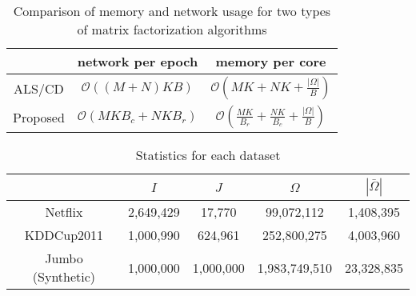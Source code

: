 \documentclass{article}
\newcommand{\1}[0]{\ensuremath{\boldsymbol{1}}\xspace}
\begin{document}
\begin{table}\label{mf_alg_comp}
\scriptsize
\caption{Comparison of memory and network usage for two types of matrix factorization algorithms}
\begin{tabular}{c|c|c}
~  &  network per epoch & memory per core\\
\hline
ALS/CD & $\mathcal{O}( (M+N) K B)$  & $\mathcal{O}(MK+NK + \frac{|\Omega|}{B})$  \\
Proposed & $\mathcal{O}( MK B_{c} + NK B_{r})$ & $\mathcal{O}(\frac{MK}{B_{r}}+\frac{NK}{B_{c}} + \frac{|\Omega|}{B})$ \\
\end{tabular}
\end{table}


\begin{table}\label{mf_datasets}
\scriptsize
\caption{ Statistics for each dataset}
\begin{tabular}{c|cccc}
~ & $I$ & $J$ & $\Omega$ & $|\bar\Omega|$ \\
\hline
Netflix & 2,649,429 & 17,770 & 99,072,112 &  1,408,395\\
KDDCup2011 & 1,000,990  & 624,961 &  252,800,275 & 4,003,960\\
Jumbo (Synthetic) & 1,000,000 & 1,000,000 & 1,983,749,510 & 23,328,835
\end{tabular}
\end{table}




\newpage


\end{document}
